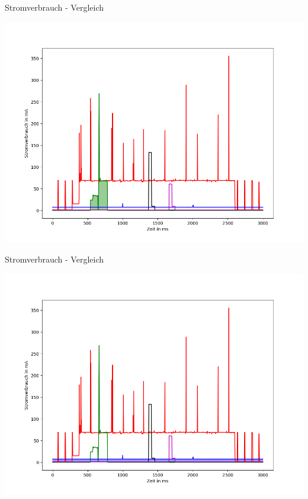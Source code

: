 \documentclass[18pt]{beamer}
\begin{document}
\begin{frame}{Stromverbrauch - Vergleich}
	\begin{minipage}[c][\textheight][t]{\textwidth}
		\centering
		\includegraphics[height=0.85\textheight]{plots/alle2.png}
	\end{minipage}
\end{frame}

\begin{frame}{Stromverbrauch - Vergleich}
	\begin{minipage}[c][\textheight][t]{\textwidth}
		\centering
		\includegraphics[height=0.85\textheight]{plots/alle3.png}
	\end{minipage}
\end{frame}
\end{document}
